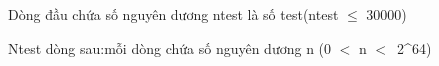 Dòng đầu chứa số nguyên dương ntest là số test(ntest $\le$ 30000)

Ntest dòng sau:mỗi dòng chứa số nguyên dương n (0 $<$ n $<$ 2^64)

\